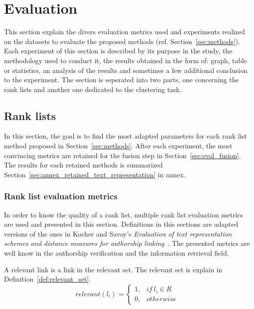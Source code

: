 \section{Evaluation \label{sec:evaluation}}

This section explain the divers evaluation metrics used and experiments realized on the datasets to evaluate the proposed methods (ref. Section~\ref{sec:methods}).
Each experiment of this section is described by its purpose in the study, the methodology used to conduct it, the results obtained in the form of: graph, table or statistics, an analysis of the results and sometimes a few additional conclusion to the experiment.
The section is seperated into two parts, one concerning the rank lists and another one dedicated to the clustering task.

\subsection{Rank lists \label{sec:eval_rl}}

In this section, the goal is to find the most adapted parameters for each rank list method proposed in Section~\ref{sec:methods}.
After each experiment, the most convincing metrics are retained for the fusion step in Section~\ref{sec:eval_fusion}.
The results for each retained methods is summarized Section~\ref{sec:annex_retained_text_representation} in annex.

\subsubsection{Rank list evaluation metrics}
\label{sec:rl_eval}

In order to know the quality of a rank list, multiple rank list evaluation metrics are used and presented in this section.
Definitions in this sections are adapted versions of the ones in Kocher and Savoy's \textit{Evaluation of text representation schemes and distance measures for authorship linking}~\cite{kocher_linking}.
The presented metrics are well know in the authorship verification and the information retrieval field.

\begin{definition}
  A relevant link is a link in the relevant set.
  The relevant set is explain in Definition~\ref{def:relevant_set}.
  \begin{equation}
    relevant(l_i) =
    \begin{cases}
      1, & if\ l_i \in R \\
      0, & otherwise
    \end{cases}
  \end{equation}
\end{definition}

